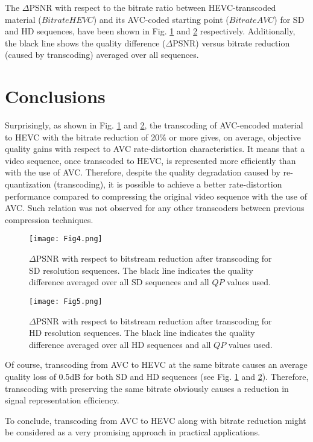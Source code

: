 \documentclass[twocolumn]{svjour3}          %
\begin{document}
The $\Delta$PSNR with respect to the bitrate ratio between HEVC-transcoded material ($BitrateHEVC$) and its AVC-coded starting point ($BitrateAVC$) for SD and HD sequences, have been shown in Fig. \ref{fig:4} and \ref{fig:5} respectively. Additionally, the black line shows the quality difference ($\Delta$PSNR) versus bitrate reduction (caused by transcoding) averaged over all sequences.

\section{Conclusions}
\label{sec:4}
Surprisingly, as shown in Fig. \ref{fig:4} and \ref{fig:5}, the transcoding of AVC-encoded material to HEVC with the bitrate reduction of 20\% or more gives, on average, objective quality gains with respect to AVC rate-distortion characteristics. It means that a video sequence, once transcoded to HEVC, is represented more efficiently than with the use of AVC. Therefore, despite the quality degradation caused by re-quantization (transcoding), it is possible to achieve a better rate-distortion performance compared to compressing the original video sequence with the use of AVC. Such relation was not observed for any other transcoders between previous compression techniques.

\begin{figure}
\texttt{[image: Fig4.png]}
\caption{$\Delta$PSNR with respect to bitstream reduction after transcoding for SD resolution sequences. The black line indicates the quality difference averaged over all SD sequences and all $QP$ values used.}
\label{fig:4}       %
\end{figure}

\begin{figure}
\texttt{[image: Fig5.png]}
\caption{$\Delta$PSNR with respect to bitstream reduction after transcoding for HD resolution sequences. The black line indicates the quality difference averaged over all HD sequences and all $QP$ values used.}
\label{fig:5}       %
\end{figure}

Of course, transcoding from AVC to HEVC at the same bitrate causes an average quality loss of 0.5dB for both SD and HD sequences (see Fig. \ref{fig:4} and \ref{fig:5}). Therefore, transcoding with preserving the same bitrate obviously causes a reduction in signal representation efficiency.

To conclude, transcoding from AVC to HEVC along with bitrate reduction might be considered as a very promising approach in practical applications.
\end{document}
